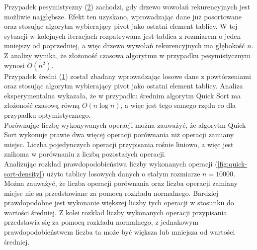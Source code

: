 Przypadek pesymistyczny (\ref{fig:quick-sort-pessimistic}) zachodzi, gdy drzewo wowołań rekurencyjnych jest możliwie najgłębsze. Efekt ten uzyskano, wprowadzając dane już posortowane oraz stosując algorytm wybierający pivot jako ostatni element tablicy. W tej sytuacji w kolejnych iteracjach rozpatrywana jest tablica z rozmiarem o jeden mniejszy od poprzedniej, a więc drzewo wywołań rekurencyjnych ma głębokość $n$. Z analizy wynika, że złożoność czasowa algorytmu w przypadku pesymistycznym wynosi $O(n^2)$.\\

Przypadek średni (\ref{fig:quick-sort-optimistic-average}) został zbadany wprowadzając losowe dane z powtórzeniami oraz stosując algorytm wybierający pivot jako ostatni element tablicy. Analiza eksperymentalna wykazała, że w przypadku średnim algorytm Quick Sort ma złożoność czasową równą $O(n\log{}n)$, a więc jest tego samego rzędu co dla przypadku optymistycznego.\\

Porównując liczbę wykonywanych operacji można zauważyć, że algorytm Quick Sort wykonuje prawie dwa więcej operacji porównania
niż operacji zamiany miejsc. Liczba pojedynczych operacji przypisania rośnie liniowo, a więc jest znikoma w porównaniu z
liczbą pozostałych operacji.\\

Analizując rozkład prawdopodobieństwa liczby wykonanych operacji (\ref{fig:quick-sort-density}) użyto tablicy losowych danych o stałym rozmiarze $n = 10000$. Można zauważyć, że liczba operacji porównania oraz liczba operacji zamiany miejsc nie są przedstawiane za pomocą rozkładu normalnego. Bardziej prawdopodobne jest wykonanie większej liczby tych operacji w stosunku do wartości średniej. Z kolei rozkład liczby wykonanych operacji przypisania przedstawia się za pomocą rozkładu normalnego, z jednakowym prawdopodobieństwem liczba ta może być większa lub mniejsza od wartości średniej.\\

\begin{figure}[H]
	\centering
	
	\caption[]{}
	\label{fig:quick-sort-optimistic-average}
\end{figure}

\begin{figure}[H]
	\centering
	
	\caption[]{}
	\label{fig:quick-sort-pessimistic}
\end{figure}

